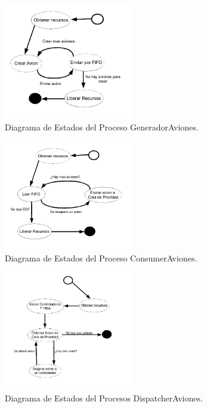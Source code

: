 \documentclass[a4paper,12pt,titlepage]{article}
\begin{document}
\begin{figure}
  \centering
    \includegraphics[width=0.5\textwidth] {dia_est-generadorAviones}
  \caption{Diagrama de Estados del Proceso GeneradorAviones.}
  \label{fig:dia_est_generadorAviones}
\end{figure}



\begin{figure}
  \centering
    \includegraphics[width=0.5\textwidth] {dia_est-consumerAviones}
  \caption{Diagrama de Estados del Proceso ConsumerAviones.}
  \label{fig:dia_est_consumerAviones}
\end{figure}



\begin{figure}
  \centering
    \includegraphics[width=0.5\textwidth] {dia_est-dispatcherAviones}
  \caption{Diagrama de Estados del Procesos DispatcherAviones.}
  \label{fig:dia_est_dispatcherAviones}
\end{figure}
\end{document}
